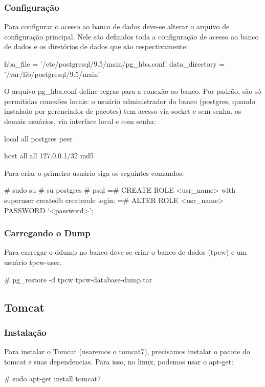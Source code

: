 \documentclass[a4paper,10pt]{article}
\begin{document}
        \subsubsection{Configuração}
        Para configurar o acesso ao banco de dados deve-se alterar o arquivo de configuração principal. Nele são definidos toda a configuração de acesso ao banco de dados e os diretórios de dados que são respectivamente:

        \begin{spverbatim}
        hba_file = '/etc/postgresql/9.5/main/pg_hba.conf'
        data_directory = '/var/lib/postgresql/9.5/main'
        \end{spverbatim}

        O arquivo pg\_hba.conf define regras para a conexão ao banco. Por padrão, são só permitidas conexões locais: o usuário administrador do banco (postgres, quando instalado por gerenciador de pacotes) tem acesso via socket e sem senha. os demais usuários, via interface local e com senha:
        \begin{spverbatim}
        local   all         postgres            peer

        host    all         all         127.0.0.1/32            md5
        \end{spverbatim}

    Para criar o primeiro usuário siga os seguintes comandos:
        \begin{spverbatim}
            # sudo su
            # su postgres
            # psql
            =# CREATE ROLE <usr_name> with superuser createdb createrole login;
            =# ALTER ROLE <usr_name> PASSWORD ‘<password>’;
        \end{spverbatim}

        \subsubsection{Carregando o Dump}
        Para carregar o ddump no banco deve-se criar o banco de dados (tpcw) e um usuário tpcw-user.
        \begin{spverbatim}
        # pg_restore -d tpcw tpcw-database-dump.tar
        \end{spverbatim}


    \subsection{Tomcat}
        \subsubsection{Instalação}
        Para instalar o Tomcat (usaremos o tomcat7), precisamos instalar o pacote do tomcat e suas dependencias. Para isso, no linux, podemos usar o apt-get:
        \begin{spverbatim}
        # sudo apt-get install tomcat7
        \end{spverbatim}
\end{document}
